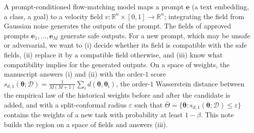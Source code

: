 \documentclass{article}
\newcommand{\RR}{\mathbb{R}}
\newcommand{\cD}{\mathcal{D}}
\newcommand{\bth}{\boldsymbol{\theta}}
\newcommand{\be}{\mathbf{e}}
\newcommand{\Tbar}{\bar{\Theta}}
\theoremstyle{plain}
\theoremstyle{remark}
\begin{document}
A prompt-conditioned flow-matching model maps a prompt $\be$ (a text embedding, a class, a
goal) to a velocity field $v:\RR^n\times[0,1]\to\RR^n$; integrating the field from Gaussian
noise generates the outputs of the prompt. The fields of approved prompts $\be_1,\dots,\be_M$
generate safe outputs. For a new prompt, which may be unsafe or adversarial, we want to
(i) decide whether its field is compatible with the safe fields, (ii) replace it by a compatible
field otherwise, and (iii) know what compatibility implies for the generated outputs. On a space
of weights, the manuscript answers (i) and (ii) with the order-$1$ score
$s_{d,1}(\bth;\cD)=\frac{1}{M(M+1)}\sum_{i}d(\bth,\bth_i)$, the order-$1$ Wasserstein distance
between the empirical law of the historical weights before and after the candidate is added,
and with a split-conformal radius $\varepsilon$ such that $\Tbar=\{\bth:s_{d,1}(\bth;\cD)\le\varepsilon\}$
contains the weights of a new task with probability at least $1-\beta$. This note builds the
region on a space of fields and answers (iii).
\end{document}

